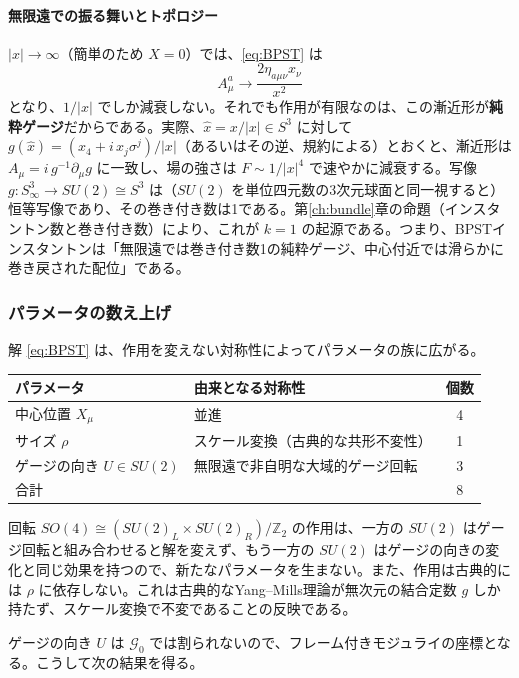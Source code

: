 \documentclass[uplatex, dvipdfmx, book]{jsbook}
\let\origsubsubsection\subsubsection
\renewcommand{\subsection}{\origsubsubsection}
\renewcommand{\subsubsection}{\paragraph}
\begin{document}
\paragraph{無限遠での振る舞いとトポロジー}
$|x| \to \infty$（簡単のため $X = 0$）では、\eqref{eq:BPST} は
\begin{equation}
    A_\mu^a \to \frac{2\eta_{a\mu\nu}x_\nu}{x^2}
\end{equation}
となり、$1/|x|$ でしか減衰しない。それでも作用が有限なのは、この漸近形が\textbf{純粋ゲージ}だからである。実際、$\hat{x} = x/|x| \in S^3$ に対して $g(\hat{x}) = (x_4 + i\,x_j\sigma^j)/|x|$（あるいはその逆、規約による）とおくと、漸近形は $A_\mu = i\,g^{-1}\partial_\mu g$ に一致し、場の強さは $F \sim 1/|x|^4$ で速やかに減衰する。写像 $g: S^3_\infty \to SU(2) \cong S^3$ は（$SU(2)$ を単位四元数の3次元球面と同一視すると）恒等写像であり、その巻き付き数は1である。第\ref{ch:bundle}章の命題（インスタントン数と巻き付き数）により、これが $k = 1$ の起源である。つまり、BPSTインスタントンは「無限遠では巻き付き数1の純粋ゲージ、中心付近では滑らかに巻き戻された配位」である。

\subsection{パラメータの数え上げ}

解 \eqref{eq:BPST} は、作用を変えない対称性によってパラメータの族に広がる。
\begin{center}
\begin{tabular}{llc}
    \hline
    パラメータ & 由来となる対称性 & 個数 \\
    \hline
    中心位置 $X_\mu$ & 並進 & 4 \\
    サイズ $\rho$ & スケール変換（古典的な共形不変性） & 1 \\
    ゲージの向き $U \in SU(2)$ & 無限遠で非自明な大域的ゲージ回転 & 3 \\
    \hline
    合計 & & 8 \\
    \hline
\end{tabular}
\end{center}
回転 $SO(4) \cong (SU(2)_L \times SU(2)_R)/\mathbb{Z}_2$ の作用は、一方の $SU(2)$ はゲージ回転と組み合わせると解を変えず、もう一方の $SU(2)$ はゲージの向きの変化と同じ効果を持つので、新たなパラメータを生まない。また、作用は古典的には $\rho$ に依存しない。これは古典的なYang--Mills理論が無次元の結合定数 $g$ しか持たず、スケール変換で不変であることの反映である。

ゲージの向き $U$ は $\mathcal{G}_0$ では割られないので、フレーム付きモジュライの座標となる。こうして次の結果を得る。
\end{document}
